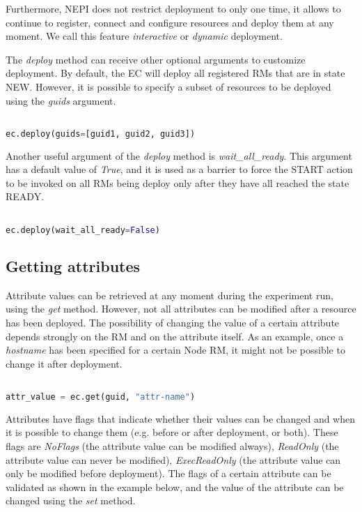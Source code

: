 Furthermore, NEPI does not restrict deployment to only one time, it allows
to continue to register, connect and configure resources and deploy them
at any moment. We call this feature \emph{interactive} or \emph{dynamic}
deployment. 

The \emph{deploy} method can receive other optional arguments to customize
deployment. By default, the EC will deploy all registered RMs that are in
state NEW. However, it is possible to specify a subset of resources to be
deployed using the \emph{guids} argument.

\begin{lstlisting}[language=Python]

ec.deploy(guids=[guid1, guid2, guid3])

\end{lstlisting}

Another useful argument of the \emph{deploy} method is \emph{wait\_all\_ready}.
This argument has a default value of \emph{True}, and it is used as a barrier
to force the START action to be invoked on all RMs being deploy only after
they have all reached the state READY.

\begin{lstlisting}[language=Python]

ec.deploy(wait_all_ready=False)

\end{lstlisting}


\subsection{Getting attributes}

Attribute values can be retrieved at any moment during the experiment run, 
using the \emph{get} method. 
However, not all attributes can be modified after a resource has
been deployed. The possibility of changing the value of a certain attribute 
depends strongly on the RM and on the attribute itself. 
As an example, once a \emph{hostname} has been specified for a certain Node 
RM, it might not be possible to change it after deployment.

\begin{lstlisting}[language=Python]

attr_value = ec.get(guid, "attr-name")

\end{lstlisting}

Attributes have flags that indicate whether their values can be changed
and when it is possible to change them (e.g. before or after deployment, 
or both). These flags are \emph{NoFlags} (the attribute value can be 
modified always), \emph{ReadOnly} (the attribute value can never be
modified), \emph{ExecReadOnly} (the attribute value can only be modified
before deployment). The flags of a certain attribute can be validated 
as shown in the example below, and the value of the attribute can be
changed using the \emph{set} method.  

